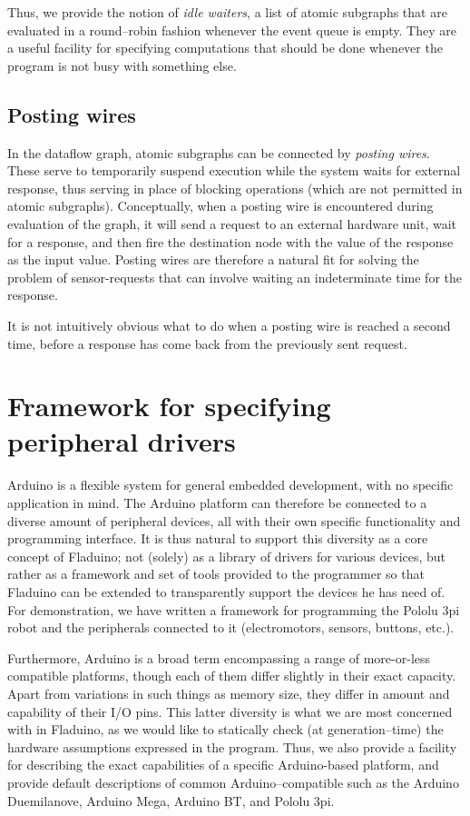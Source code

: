 \documentclass[a4paper, oneside, final]{memoir}
\begin{document}
Thus, we provide the notion of \textit{idle waiters}, a list of atomic
subgraphs that are evaluated in a round--robin fashion whenever the
event queue is empty.  They are a useful facility for specifying
computations that should be done whenever the program is not busy with
something else.

\subsection{Posting wires}

In the dataflow graph, atomic subgraphs can be connected by
\textit{posting wires}.  These serve to temporarily suspend execution
while the system waits for external response, thus serving in place of
blocking operations (which are not permitted in atomic subgraphs).
Conceptually, when a posting wire is encountered during evaluation of
the graph, it will send a request to an external hardware unit, wait
for a response, and then fire the destination node with the value of
the response as the input value.  Posting wires are therefore a
natural fit for solving the problem of sensor-requests that can
involve waiting an indeterminate time for the response.

It is not intuitively obvious what to do when a posting wire is
reached a second time, before a response has come back from the
previously sent request.

\section{Framework for specifying peripheral drivers}
Arduino is a flexible system for general embedded development, with no
specific application in mind.  The Arduino platform can therefore be
connected to a diverse amount of peripheral devices, all with their
own specific functionality and programming interface.  It is thus
natural to support this diversity as a core concept of Fladuino; not
(solely) as a library of drivers for various devices, but rather as a
framework and set of tools provided to the programmer so that Fladuino
can be extended to transparently support the devices he has need of.
For demonstration, we have  written a
framework for programming the Pololu 3pi robot and the peripherals
connected to it (electromotors, sensors, buttons, etc.).

Furthermore, Arduino is a broad term encompassing a range of
more-or-less compatible platforms, though each of them differ slightly
in their exact capacity.  Apart from variations in such things as
memory size, they differ in amount and capability of their I/O pins.
This latter diversity is what we are most concerned with in Fladuino,
as we would like to statically check (at generation--time) the
hardware assumptions expressed in the program.  Thus, we also provide
a facility for describing the exact capabilities of a specific
Arduino-based platform, and provide default descriptions of common
Arduino--compatible such as the Arduino Duemilanove, Arduino Mega,
Arduino BT, and Pololu 3pi.
\end{document}
